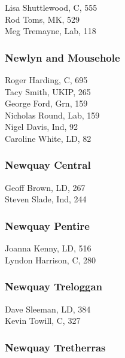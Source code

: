 \documentclass[a4paper,openany,10pt]{book}
\begin{document}
Lisa Shuttlewood, C, 555\\
Rod Toms, MK, 529\\
Meg Tremayne, Lab, 118\\


\subsubsection*{Newlyn and Mousehole}



Roger Harding, C, 695\\
Tacy Smith, UKIP, 265\\
George Ford, Grn, 159\\
Nicholas Round, Lab, 159\\
Nigel Davis, Ind, 92\\
Caroline White, LD, 82\\


\subsubsection*{Newquay Central}



Geoff Brown, LD, 267\\
Steven Slade, Ind, 244\\


\subsubsection*{Newquay Pentire}



Joanna Kenny, LD, 516\\
Lyndon Harrison, C, 280\\


\subsubsection*{Newquay Treloggan}



Dave Sleeman, LD, 384\\
Kevin Towill, C, 327\\


\subsubsection*{Newquay Tretherras}
\end{document}
